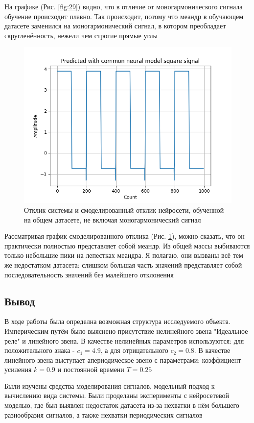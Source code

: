На графике (Рис. \ref{fig:29}) видно, что в отличие от моногармонического сигнала обучение происходит плавно. Так происходит, потому что
меандр в обучающем датасете заменился на моногармонический сигнал, в котором преобладает скругленённость, нежели чем строгие прямые углы

\begin{figure}[H]
	\centering
	\includegraphics[width=0.7\linewidth]{body/images/Predicted-with-common-neural-model-square-signal.png}
	\caption{Отклик системы и смоделированный отклик нейросети, обученной на общем датасете, не включая моногармонический сигнал}
	\label{fig:30}
\end{figure}

Рассматривая график смоделированного отклика (Рис. \ref{fig:30}), можно сказать, что он практически полностью представляет собой меандр.
Из общей массы выбиваются только небольшие пики на лепестках меандра. Я полагаю, они вызваны всё тем же недостатком датасета: слишком большая часть
значений представляет собой последовательность значений без малейшего отклонения

\newpage

\subsection{Вывод}

В ходе работы была определна возможная структура исследуемого объекта. Империческим путём было выяснено присутствие нелинейного звена "Идеальное реле" и линейного звена.
В качестве нелинейных параметров используются: для положительного знака - $ c_1 = 4.9 $, а для отрицательного $ c_2 = 0.8 $.
В качестве линейного звена выступает апериодическое звено с параметрами: коэффициент усиления $ k = 0.9 $ и постоянной времени $ T = 0.25 $

Были изучены средства моделирования сигналов, модельный подход к вычислению вида системы. Были проделаны эксперименты с нейросетевой моделью, где был 
выявлен недостаток датасета из-за нехватки в нём большего разнообразия сигналов, а также нехватки периодических сигналов

